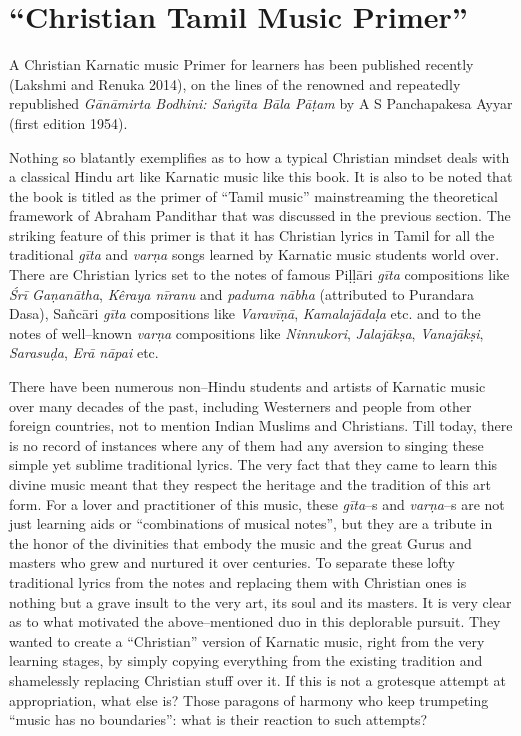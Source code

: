 \newpage

\section*{“Christian Tamil Music Primer”}

A Christian Karnatic music Primer for learners has been published recently (Lakshmi and Renuka 2014), on the lines of the renowned and repeatedly republished \textit{Gānāmirta Bodhini: Saṅgīta Bāla Pāṭam} by A S Panchapakesa Ayyar (first edition 1954).

Nothing so blatantly exemplifies as to how a typical Christian mindset deals with a classical Hindu art like Karnatic music like this book. It is also to be noted that the book is titled as the primer of “Tamil music” mainstreaming the theoretical framework of Abraham Pandithar that was discussed in the previous section. The striking feature of this primer is that it has Christian lyrics in Tamil for all the traditional \textit{gīta} and \textit{varṇa} songs learned by Karnatic music students world over. There are Christian lyrics set to the notes of famous Piḷḷāri \textit{gīta} compositions like \textit{Śrī Gaṇanātha}, \textit{Kêraya nīranu} and \textit{paduma nābha }(attributed to Purandara Dasa), Sañcāri \textit{gīta} compositions like \textit{Varavīṇā}, \textit{Kamalajādaḷa} etc. and to the notes of well–known \textit{varṇa} compositions like \textit{Ninnukori}, \textit{Jalajākṣa}, \textit{Vanajākṣi}, \textit{Sarasuḍa}, \textit{Erā nāpai} etc.

There have been numerous non–Hindu students and artists of Karnatic music over many decades of the past, including Westerners and people from other foreign countries, not to mention Indian Muslims and Christians. Till today, there is no record of instances where any of them had any aversion to singing these simple yet sublime traditional lyrics. The very fact that they came to learn this divine music meant that they respect the heritage and the tradition of this art form. For a lover and practitioner of this music, these \textit{gīta}–s and \textit{varṇa}–s are not just learning aids or “combinations of musical notes”, but they are a tribute in the honor of the divinities that embody the music and the great Gurus and masters who grew and nurtured it over centuries. To separate these lofty traditional lyrics from the notes and replacing them with Christian ones is nothing but a grave insult to the very art, its soul and its masters. It is very clear as to what motivated the above–mentioned duo in this deplorable pursuit. They wanted to create a “Christian” version of Karnatic music, right from the very learning stages, by simply copying everything from the existing tradition and shamelessly replacing Christian stuff over it. If this is not a grotesque attempt at appropriation, what else is? Those paragons of harmony who keep trumpeting “music has no boundaries”: what is their reaction to such attempts?


